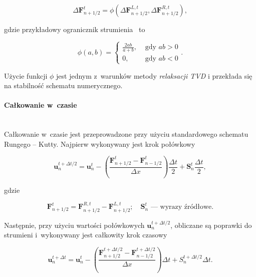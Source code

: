 \begin{equation}
   \Delta \mathbf{F}^{t}_{n+1/2} = \phi\left(\Delta
   \mathbf{F}^{L,t}_{n+1/2},\Delta \mathbf{F}^{R,t}_{n+1/2} \right),
\end{equation}

gdzie przykładowy ogranicznik strumienia~\cite{leer} to

\begin{equation}
   \phi(a,b) = 
   \begin{cases}
      \frac{2ab}{a+b}, & \textrm{ gdy }ab>0 \\
      0, & \textrm{ gdy }ab<0
   \end{cases}.
\end{equation}

Użycie funkcji $\phi$ jest jednym z~warunków metody \emph{relaksacji TVD} i
przekłada się na stabilność schematu numerycznego.

\paragraph{Całkowanie w~czasie}~\\

Całkowanie w~czasie jest przeprowadzone przy użyciu standardowego schematu
Rungego -- Kutty. Najpierw wykonywany jest krok połówkowy

\begin{equation}
   \mathbf{u}^{t+\Delta t/2}_{n} = \mathbf{u}^{t}_{n} -
   \left(\frac{\mathbf{F}^t_{n+1/2} - \mathbf{F}^t_{n-1/2}}{\Delta x}
   \right)\frac{\Delta t}{2} + \mathbf{S}_n^t \frac{\Delta t}{2},
\end{equation}

gdzie

\begin{equation}
   \mathbf{F}^{t}_{n+1/2} = \mathbf{F}^{R,t}_{n+1/2} -
   \mathbf{F}^{L,t}_{n+1/2};\quad \mathbf{S}_n^t\textrm{ --- wyrazy źródłowe}.
\end{equation}

Następnie, przy użyciu wartości połówkowych $\mathbf{u}^{t+\Delta t/2}_{n}$,
obliczane są poprawki do strumieni i~wykonywany jest całkowity krok czasowy

\begin{equation}
   \mathbf{u}^{t+\Delta t}_{n} = \mathbf{u}^{t}_{n} -
   \left(\frac{\mathbf{F}^{t+\Delta t/2}_{n+1/2} - \mathbf{F}^{t+\Delta
   t/2}_{n-1/2}}{\Delta x} \right)\Delta t + S_n^{t+\Delta t/2}\Delta t.
\end{equation}

